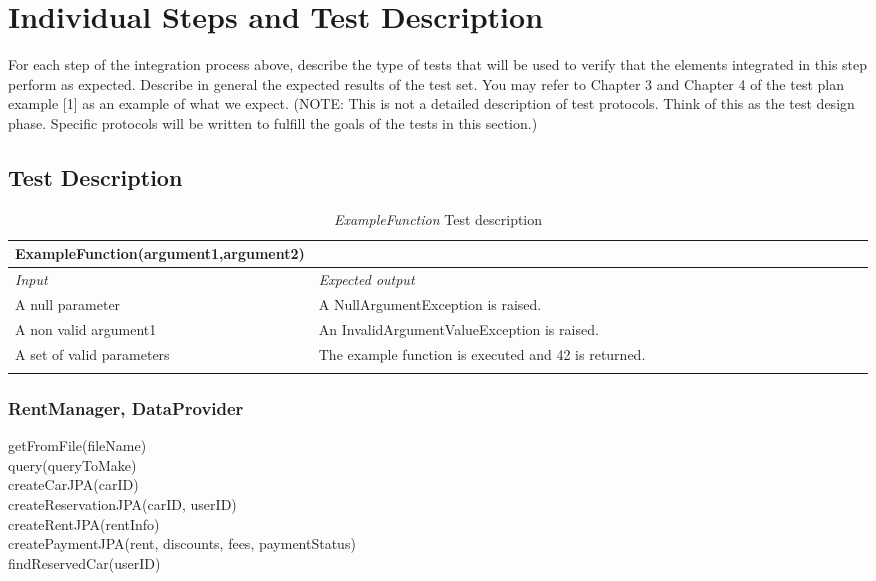 \section{Individual Steps and Test Description}

For each step of the integration process above, describe the type of tests that will be used to verify that the elements integrated in this step perform as expected. Describe in general the expected results of the test set. You may refer to Chapter 3 and Chapter 4 of the test plan example [1] as an example of what we expect.
(NOTE: This is not a detailed description of test protocols. Think of this as the test design phase. Specific protocols will be written to fulfill the goals of the tests in this section.)

\subsection{Test Description}

\begin{longtable}{p{0.3\linewidth}p{0.7\linewidth}}
\hline \textbf{ExampleFunction(argument1,argument2)} \\
\toprule
\emph{Input} & \emph{Expected output} \\
\midrule
A null parameter & A NullArgumentException is raised.\\
\midrule
A non valid argument1 & An InvalidArgumentValueException is
raised. \\
\midrule
A set of valid parameters & The example function is executed and 42 is returned. \\
\bottomrule
\caption{\emph{ExampleFunction} Test description}
\end{longtable}

\subsubsection{RentManager, DataProvider}
getFromFile(fileName) \\
query(queryToMake) \\
createCarJPA(carID) \\
createReservationJPA(carID, userID) \\
createRentJPA(rentInfo) \\
createPaymentJPA(rent, discounts, fees, paymentStatus) \\ %
findReservedCar(userID) %

